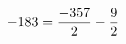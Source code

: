 \documentclass[preview]{standalone}
\begin{document}
\begin{align*}
\special{dvisvgm:raw <g id='unique000'>}-183 = \frac{-357}{2} - \frac{9}{2}\special{dvisvgm:raw </g>}
\end{align*}
\end{document}
